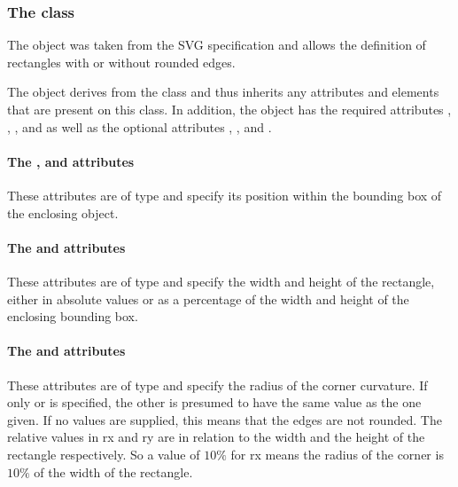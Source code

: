 \subsubsection{The  class}
\label{renderrectangle-class}

The \RenderRectangle object was taken from the SVG specification and allows the 
definition of 
rectangles with or without rounded edges. 

The \RenderRectangle object derives from the \GraphicalPrimitiveTwoD
class and thus inherits any attributes and elements that are present on
this class.
In addition, the \RenderRectangle object has the required attributes , 
, , and  as well as the optional attributes 
, ,  and .

\paragraph{The \fixttspace{}, \fixttspace{} and \fixttspace{}  attributes}

These attributes are of type
\RelAbsVector and specify its position within the 
bounding box of the enclosing \Layout object.

\paragraph{The \fixttspace{} and \fixttspace{} attributes}

These attributes are of type
\RelAbsVector and specify the width and height of the rectangle, 
either in absolute values or as a percentage of the width and height of the 
enclosing bounding box. 

\paragraph{The \fixttspace{} and \fixttspace{} attributes}

These attributes are of type
\RelAbsVector and specify the radius of the corner curvature. If only 
or  is specified, the other is presumed to have the same value as the 
one given. If no values are supplied, this means that the edges are not rounded.
The relative values in rx and ry are in relation to the width and the height of
 the rectangle respectively. So a value of $10\%$ for rx means the radius of 
the corner is $10\%$ of the width of the rectangle. 


